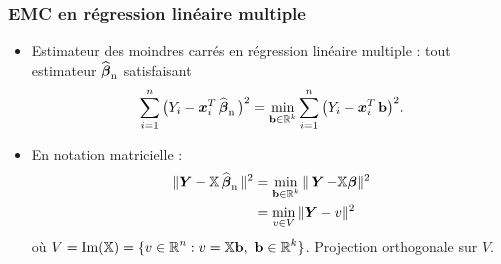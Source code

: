 





\begin{frame}
\frametitle{EMC en régression linéaire multiple}
\begin{itemize}
\item Estimateur des \alert{moindres carrés} en régression
linéaire multiple : tout estimateur $\operatorname{\widehat{\boldsymbol{\beta}}_n}$ satisfaisant
$$\sum_{i = 1}^n
\big(Y_i- \operatorname{\boldsymbol{x}}_i^T \operatorname{\widehat{\boldsymbol{\beta}}_n} \big)^2 = \min_{\mathbf{b} \in \operatorname{{\mathbb R}}^k}\sum_{i =
1}^n \big(Y_i- \operatorname{\boldsymbol{x}}_i^T \mathbf{b}\big)^2.$$
\item En notation matricielle :
\begin{align*}
\|\boldsymbol{Y}-\mathbb{X}\operatorname{\widehat{\boldsymbol{\beta}}_n}\|^2 &=   \min_{\mathbf{b} \in \operatorname{{\mathbb R}}^k}\|\operatorname{\boldsymbol{Y}} -\mathbb{X}\boldsymbol{\beta}\|^2\\
&= \min_{v \in V}\|\boldsymbol{Y}-v\|^2
\end{align*}
o\`u $V=\text{Im}(\mathbb{X}) = \{v\in \operatorname{{\mathbb R}}^n: v=\mathbb{X} \mathbf{b}, \
\mathbf{b} \in \operatorname{{\mathbb R}}^k\}$. \alert{Projection orthogonale sur $V$}.
\end{itemize}
\end{frame}



